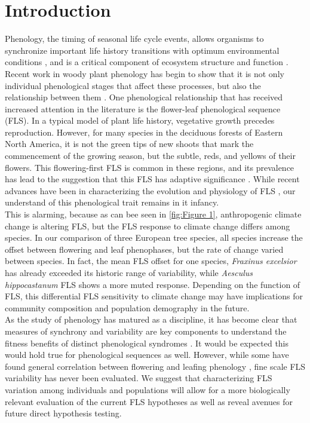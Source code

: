 \documentclass[12pt]{article}\usepackage[]{graphicx}\usepackage[]{color}
\begin{document}
\section*{Introduction}
\indent \indent Phenology, the timing of seasonal life cycle events, allows organisms to synchronize important life history transitions with optimum environmental conditions \citep{Forrest2010}, and is a critical component of ecosystem structure and function \citep{Cleland2007,Piao2007}. Recent work in woody plant phenology has begin to show that it is not only individual phenological stages that affect these processes, but also the relationship between them \citep{Ettinger2018}. One phenological relationship that has received increased attention in the literature is the flower-leaf phenological sequence (FLS). In a typical model of plant life history, vegetative growth precedes reproduction. However, for many species in the deciduous forests of Eastern North America, it is not the green tips of new shoots that mark the commencement of the growing season, but the subtle, reds, and yellows of their flowers. This flowering-first FLS is common in these regions, and its prevalence has lead to the suggestion that this FLS has adaptive significance \citep{Rathcke_1985}. %
While recent advances have been in characterizing the evolution and physiology of FLS \citep{Gougherty2018,Savage2019}, our understand of this phenological trait remains in it infancy.\\ 
\indent This is alarming, because as can bee seen in \ref{fig:Figure 1}, anthropogenic climate change is altering FLS, but the FLS response to climate change differs among species. In our comparison of three European tree species, all species increase the offset between flowering and leaf phenophases, but the rate of change varied between species. In fact, the mean FLS offset for one species, \textit{Fraxinus excelsior} has already exceeded its historic range of variability, while \textit{Aesculus hippocastanum} FLS shows a more muted response. Depending on the function of FLS, this differential FLS sensitivity to climate change may have implications for community composition and population demography in the future.\\
\indent As the study of phenology has matured as a discipline, it has become clear that measures of synchrony and variability are key components to understand the fitness benefits of distinct phenological syndromes \citep{}. It would be expected this would hold true for phenological sequences as well. However, while some have found general correlation between flowering and leafing phenology \citep{Lechowicz_1995, Ettinger2018}, fine scale FLS variability has never been evaluated. We suggest that characterizing FLS variation among individuals and populations will allow for a more biologically relevant evaluation of the current FLS hypotheses as well as reveal avenues for future direct hypothesis testing.\\
\end{document}
